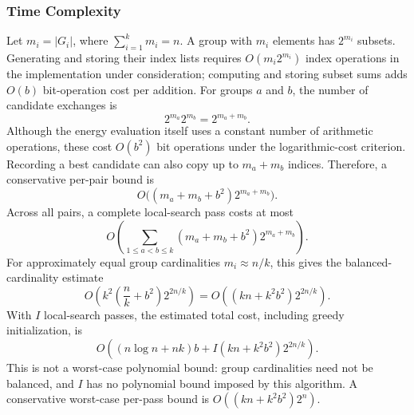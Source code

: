 \documentclass[11pt,a4paper]{article}
\begin{document}
\subsubsection{Time Complexity}
Let $m_i=|G_i|$, where $\sum_{i=1}^{k}m_i=n$. A group with $m_i$ elements has $2^{m_i}$ subsets. Generating and storing their index lists requires $O(m_i2^{m_i})$ index operations in the implementation under consideration; computing and storing subset sums adds $O(b)$ bit-operation cost per addition. For groups $a$ and $b$, the number of candidate exchanges is
\begin{equation}2^{m_a}2^{m_b}=2^{m_a+m_b}.\end{equation}
Although the energy evaluation itself uses a constant number of arithmetic operations, these cost $O(b^2)$ bit operations under the logarithmic-cost criterion. Recording a best candidate can also copy up to $m_a+m_b$ indices. Therefore, a conservative per-pair bound is
\begin{equation}O\bigl((m_a+m_b+b^2)2^{m_a+m_b}\bigr).\end{equation}
Across all pairs, a complete local-search pass costs at most
\begin{equation}
O\left(\sum_{1\le a<b\le k}(m_a+m_b+b^2)2^{m_a+m_b}\right).
\end{equation}
For approximately equal group cardinalities $m_i\approx n/k$, this gives the balanced-cardinality estimate
\begin{equation}
O\left(k^2\left(\frac nk+b^2\right)2^{2n/k}\right)
=O\left((kn+k^2b^2)2^{2n/k}\right).
\end{equation}
With $I$ local-search passes, the estimated total cost, including greedy initialization, is
\begin{equation}
O\left((n\log n+nk)b+I(kn+k^2b^2)2^{2n/k}\right).
\end{equation}
This is not a worst-case polynomial bound: group cardinalities need not be balanced, and $I$ has no polynomial bound imposed by this algorithm. A conservative worst-case per-pass bound is $O((kn+k^2b^2)2^n)$.
\end{document}
